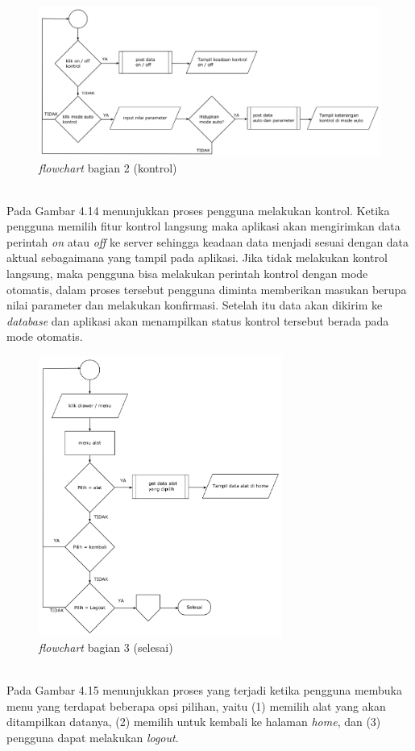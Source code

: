 \begin{flushleft}
\begin{justify}
\begin{enumerate}[label=\alph*.]
            \vspace{8cm}
            \begin{figure}[ht]
                \centering
                \includegraphics[width=12cm]{images/bab 4/fc-kontrol.png}
                \caption{\textit{flowchart} bagian 2 (kontrol)}
            \end{figure}
            \\Pada Gambar 4.14 menunjukkan proses pengguna melakukan kontrol. Ketika pengguna memilih fitur kontrol langsung maka aplikasi akan mengirimkan data perintah \emph{on} atau \emph{off}
            ke server sehingga keadaan data menjadi sesuai dengan data aktual sebagaimana yang tampil pada aplikasi. 
            Jika tidak melakukan kontrol langsung, maka pengguna bisa melakukan perintah kontrol dengan mode otomatis, dalam proses tersebut pengguna diminta memberikan masukan berupa nilai parameter dan melakukan konfirmasi. Setelah itu data akan dikirim ke \emph{database} dan aplikasi akan menampilkan status kontrol tersebut berada pada mode otomatis.
            \begin{figure}[ht]
                \centering
                \includegraphics[width=8cm]{images/bab 4/fc-pilih alat.png}
                \caption{\textit{flowchart} bagian 3 (selesai)}
            \end{figure}
            \\Pada Gambar 4.15 menunjukkan proses yang terjadi ketika pengguna membuka menu yang terdapat beberapa opsi pilihan, yaitu (1) memilih alat yang akan ditampilkan datanya, (2) memilih untuk kembali ke halaman \emph{home}, dan (3) pengguna dapat melakukan \emph{logout}.
           

\end{enumerate}
\end{justify}
\end{flushleft}
